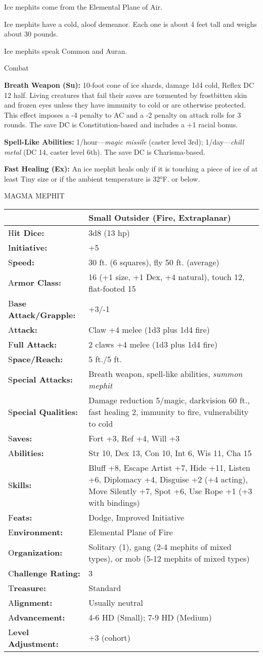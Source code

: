 \documentclass{article}
\begin{document}
Ice mephits come from the Elemental Plane of Air.

Ice mephits have a cold, aloof demeanor. Each one is about 4 feet tall and weighs 
about 30 pounds.

Ice mephits speak Common and Auran.

Combat

\textbf{Breath Weapon (Su): }10-foot cone of ice shards, damage 1d4 cold, Reflex 
DC 12 half. Living creatures that fail their saves are tormented by frostbitten 
skin and frozen eyes unless they have immunity to cold or are otherwise protected. 
This effect imposes a -4 penalty to AC and a -2 penalty on attack rolls for 3 rounds. 
The save DC is Constitution-based and includes a +1 racial bonus.

\textbf{Spell-Like Abilities:} 1/hour---\textit{magic missile }(caster level 3rd); 
1/day---\textit{chill metal }(DC 14, caster level 6th). The save DC is Charisma-based.

\textbf{Fast Healing (Ex): }An ice mephit heals only if it is touching a piece 
of ice of at least Tiny size or if the ambient temperature is 32°F. or below.

\vspace{12pt}
MAGMA MEPHIT

\begin{tabular}{|>{\raggedright}p{90pt}|>{\raggedright}p{235pt}|}
\hline
  & Small Outsider (Fire, Extraplanar)\tabularnewline
\hline
H\textbf{it Dice:} & 3d8 (13 hp)\tabularnewline
\hline
I\textbf{nitiative:} & +5\tabularnewline
\hline
S\textbf{peed:} & 30 ft. (6 squares), fly 50 ft. (average)\tabularnewline
\hline
A\textbf{rmor Class:} & 16 (+1 size, +1 Dex, +4 natural), touch 12, flat-footed 
15\tabularnewline
\hline
B\textbf{ase Attack/Grapple:} & +3/-1\tabularnewline
\hline
A\textbf{ttack:} & Claw +4 melee (1d3 plus 1d4 fire)\tabularnewline
\hline
F\textbf{ull Attack:} & 2 claws +4 melee (1d3 plus 1d4 fire)\tabularnewline
\hline
S\textbf{pace/Reach:} & 5 ft./5 ft.\tabularnewline
\hline
S\textbf{pecial Attacks:} & Breath weapon, spell-like abilities, \textit{summon 
mephit}\tabularnewline
\hline
S\textbf{pecial Qualities:} & Damage reduction 5/magic, darkvision 60 ft., fast 
healing 2, immunity to fire, vulnerability to cold\tabularnewline
\hline
S\textbf{aves:} & Fort +3, Ref +4, Will +3\tabularnewline
\hline
A\textbf{bilities:} & Str 10, Dex 13, Con 10, Int 6, Wis 11, Cha 15\tabularnewline
\hline
S\textbf{kills:} & Bluff +8, Escape Artist +7, Hide +11, Listen +6, Diplomacy +4, 
Disguise +2 (+4 acting), Move Silently +7, Spot +6, Use Rope +1 (+3 with bindings)\tabularnewline
\hline
F\textbf{eats:} & Dodge, Improved Initiative\tabularnewline
\hline
E\textbf{nvironment:} & Elemental Plane of Fire\tabularnewline
\hline
O\textbf{rganization:} & Solitary (1), gang (2-4 mephits of mixed types), or mob 
(5-12 mephits of mixed types)\tabularnewline
\hline
C\textbf{hallenge Rating:} & 3\tabularnewline
\hline
T\textbf{reasure:} & Standard\tabularnewline
\hline
A\textbf{lignment:} & Usually neutral\tabularnewline
\hline
A\textbf{dvancement:} & 4-6 HD (Small); 7-9 HD (Medium)\tabularnewline
\hline
L\textbf{evel Adjustment:} & +3 (cohort)\tabularnewline
\hline
\end{tabular}
\end{document}
